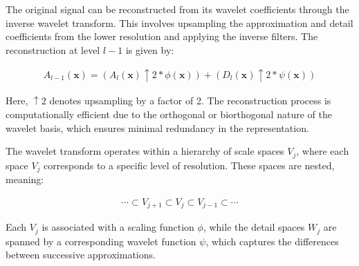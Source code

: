 
The original signal can be reconstructed from its wavelet coefficients through the inverse wavelet transform. This involves upsampling the approximation and detail coefficients from the lower resolution and applying the inverse filters. The reconstruction at level \( l-1 \) is given by:

\begin{align}
  A_{l-1}(\mathbf{x}) = \left( A_l(\mathbf{x}) \uparrow 2 * \phi(\mathbf{x}) \right) + \left( D_l(\mathbf{x}) \uparrow 2 * \psi(\mathbf{x}) \right)  
\end{align}

Here, \( \uparrow 2 \) denotes upsampling by a factor of 2. The reconstruction process is computationally efficient due to the orthogonal or biorthogonal nature of the wavelet basis, which ensures minimal redundancy in the representation.

The wavelet transform operates within a hierarchy of scale spaces \( V_j \), where each space \( V_j \) corresponds to a specific level of resolution. These spaces are nested, meaning:

\begin{align}
  \cdots \subset V_{j+1} \subset V_j \subset V_{j-1} \subset \cdots  
\end{align}



Each \( V_j \) is associated with a scaling function \( \phi \), while the detail spaces \( W_j \) are spanned by a corresponding wavelet function \( \psi \), which captures the differences between successive approximations.


